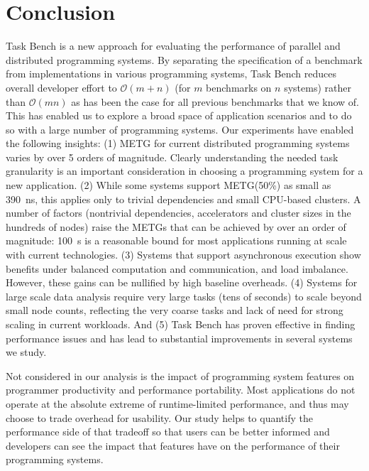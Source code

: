 \section{Conclusion}
\label{sec:conclusion}

Task Bench is a new approach for evaluating the performance of
parallel and distributed programming systems. By separating the
specification of a benchmark from implementations in various
programming systems, Task Bench reduces overall developer effort to
$\mathcal{O}(m + n)$ (for $m$ benchmarks on $n$ systems) rather than
$\mathcal{O}(mn)$ as has been the case for all previous
benchmarks that we know of. This has enabled us to explore a broad space of
application scenarios and to do so with a large number of programming
systems. Our experiments have enabled the following
insights:
(1) METG for current distributed programming systems varies by over
  5 orders of magnitude.  Clearly understanding the needed task
  granularity is an important consideration in choosing a programming
  system for a new application.
(2) While some systems support METG(50\%) as small as 390~ns, this applies only to trivial dependencies and small CPU-based clusters. A number of factors (nontrivial dependencies, accelerators and cluster sizes in the hundreds of nodes) raise
  the METGs that can be achieved by over an order of magnitude: 100~\textmu{}s is a reasonable bound for most applications running at scale with current technologies.
(3) Systems that support asynchronous execution show benefits under
  balanced computation
  and communication, and load imbalance. However, these gains can be nullified by
  high baseline overheads.
(4) Systems for large scale data analysis require very large tasks
  (tens of seconds) to scale beyond small node counts,
  reflecting the very coarse tasks and lack of need for strong scaling
  in current workloads.
And (5) Task Bench has proven effective in finding performance issues
  and has lead to substantial improvements in several systems
  we study.


Not considered in our analysis is the impact of programming system
features on programmer productivity and performance portability. Most
applications do not operate at the absolute extreme of runtime-limited
performance, and thus may choose to trade overhead for
usability. Our study helps to quantify the performance side of that
tradeoff so that users can be better informed and developers can see
the impact that features have on the performance of their programming
systems.

